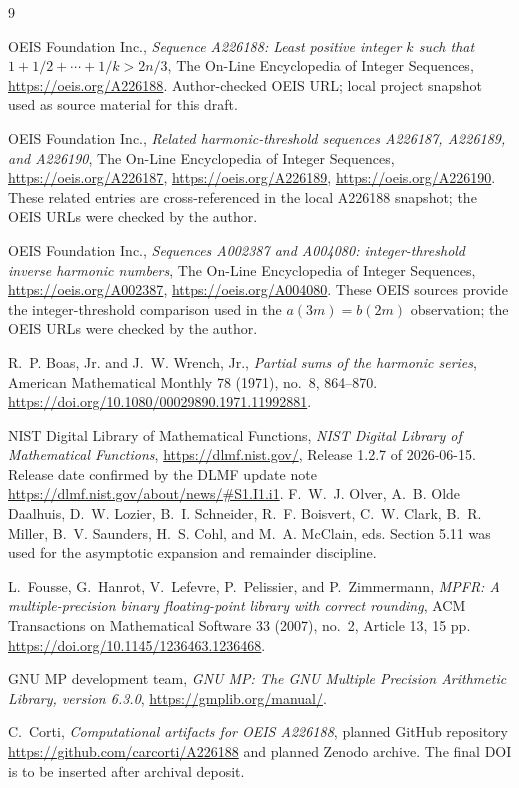 \documentclass[11pt]{article}
\theoremstyle{definition}
\theoremstyle{remark}
\begin{document}
\begin{thebibliography}{9}
\sloppy
\raggedright

OEIS Foundation Inc.,
\emph{Sequence A226188: Least positive integer \(k\) such that
\(1+1/2+\cdots+1/k>2n/3\)},
The On-Line Encyclopedia of Integer Sequences,
\url{https://oeis.org/A226188}.
Author-checked OEIS URL; local project snapshot used as source material for
this draft.

OEIS Foundation Inc.,
\emph{Related harmonic-threshold sequences A226187, A226189, and A226190},
The On-Line Encyclopedia of Integer Sequences,
\url{https://oeis.org/A226187},
\url{https://oeis.org/A226189},
\url{https://oeis.org/A226190}.
These related entries are cross-referenced in the local A226188 snapshot; the
OEIS URLs were checked by the author.

OEIS Foundation Inc.,
\emph{Sequences A002387 and A004080: integer-threshold inverse harmonic
numbers},
The On-Line Encyclopedia of Integer Sequences,
\url{https://oeis.org/A002387},
\url{https://oeis.org/A004080}.
These OEIS sources provide the integer-threshold comparison used in the
\(a(3m)=b(2m)\) observation; the OEIS URLs were checked by the author.

R.~P. Boas, Jr. and J.~W. Wrench, Jr.,
\emph{Partial sums of the harmonic series},
American Mathematical Monthly 78 (1971), no.~8, 864--870.
\url{https://doi.org/10.1080/00029890.1971.11992881}.

NIST Digital Library of Mathematical Functions,
\emph{NIST Digital Library of Mathematical Functions},
\url{https://dlmf.nist.gov/}, Release 1.2.7 of 2026-06-15.
Release date confirmed by the DLMF update note
\url{https://dlmf.nist.gov/about/news/#S1.I1.i1}.
F.~W.~J. Olver, A.~B. Olde Daalhuis, D.~W. Lozier, B.~I. Schneider,
R.~F. Boisvert, C.~W. Clark, B.~R. Miller, B.~V. Saunders, H.~S. Cohl,
and M.~A. McClain, eds.
Section 5.11 was used for the asymptotic expansion and remainder discipline.

L.~Fousse, G.~Hanrot, V.~Lefevre, P.~Pelissier, and P.~Zimmermann,
\emph{MPFR: A multiple-precision binary floating-point library with correct
rounding},
ACM Transactions on Mathematical Software 33 (2007), no.~2, Article 13,
15 pp. \url{https://doi.org/10.1145/1236463.1236468}.

GNU MP development team,
\emph{GNU MP: The GNU Multiple Precision Arithmetic Library, version 6.3.0},
\url{https://gmplib.org/manual/}.

C.~Corti,
\emph{Computational artifacts for OEIS A226188},
planned GitHub repository \url{https://github.com/carcorti/A226188} and planned
Zenodo archive.  The final DOI is to be inserted after archival deposit.

\end{thebibliography}
\end{document}
